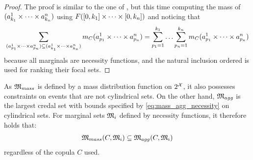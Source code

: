 \begin{proof}
    The proof is similar to the one of , but this time computing the mass of $(a_{k_1}^1\times\dots\times a_{k_n}^n)$ using $F([0,k_1]\times\dots\times[0,k_n])$ and noticing that \begin{eqnarray*}
        \sum_{(a^1_{p_1}\times\dots\times a^n_{p_n})\subseteq(a^1_{k_1}\times\dots\times a^n_{k_n})}m_C(a^1_{p_1}\times\dots\times a^n_{p_n})=\sum_{p_1=1}^{k_1}\ldots\sum_{p_n=1}^{k_n} m_C(a^1_{p_1}\times\dots\times a^n_{p_n})
    \end{eqnarray*} because all marginals are necessity functions, and the natural inclusion ordered is used for ranking their focal sets.
\end{proof}

As $\mathfrak{M}_{mass}$ is defined by a mass distribution function on $2^{\mathcal{X}}$, it also possesses constraints on events that are not cylindrical sets. On the other hand, $\mathfrak{M}_{agg}$ is the largest credal set with bounds specified by \eqref{eq:mass_agg_necessity} on cylindrical sets. For marginal sets $\mathfrak{M}_i$ defined by necessity functions, it therefore holds that:
\begin{eqnarray}\label{eq:inclusion_necessity}
    \mathfrak{M}_{mass}(C, \mathfrak{M}_i) \subseteq \mathfrak{M}_{agg}(C, \mathfrak{M}_i)
\end{eqnarray}
regardless of the copula $C$ used.

